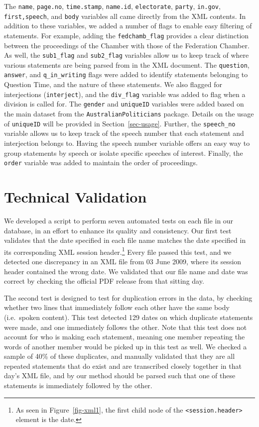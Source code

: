 \documentclass[
  letterpaper,
  DIV=11,
  numbers=noendperiod]{scrartcl}
\begin{document}
The \texttt{name}, \texttt{page.no}, \texttt{time.stamp},
\texttt{name.id}, \texttt{electorate}, \texttt{party}, \texttt{in.gov},
\texttt{first,speech}, and \texttt{body} variables all came directly
from the XML contents. In addition to these variables, we added a number
of flags to enable easy filtering of statements. For example, adding the
\texttt{fedchamb\_flag} provides a clear distinction between the
proceedings of the Chamber with those of the Federation Chamber. As
well, the \texttt{sub1\_flag} and \texttt{sub2\_flag} variables allow us
to keep track of where various statements are being parsed from in the
XML document. The \texttt{question}, \texttt{answer}, and
\texttt{q\_in\_writing} flags were added to identify statements
belonging to Question Time, and the nature of these statements. We also
flagged for interjections (\texttt{interject}), and the
\texttt{div\_flag} variable was added to flag when a division is called
for. The \texttt{gender} and \texttt{uniqueID} variables were added
based on the main dataset from the \texttt{AustralianPoliticians}
package. Details on the usage of \texttt{uniqueID} will be provided in
Section~\ref{sec-usage}. Further, the \texttt{speech\_no} variable
allows us to keep track of the speech number that each statement and
interjection belongs to. Having the speech number variable offers an
easy way to group statements by speech or isolate specific speeches of
interest. Finally, the \texttt{order} variable was added to maintain the
order of proceedings.

\hypertarget{technical-validation}{%
\section{Technical Validation}\label{technical-validation}}

We developed a script to perform seven automated tests on each file in
our database, in an effort to enhance its quality and consistency. Our
first test validates that the date specified in each file name matches
the date specified in its corresponding XML session header.\footnote{As
  seen in Figure~\ref{fig-xml1}, the first child node of the
  \texttt{\textless{}session.header\textgreater{}} element is the date.}
Every file passed this test, and we detected one discrepancy in an XML
file from 03 June 2009, where its session header contained the wrong
date. We validated that our file name and date was correct by checking
the official PDF release from that sitting day.

The second test is designed to test for duplication errors in the data,
by checking whether two lines that immediately follow each other have
the same body (i.e.~spoken content). This test detected 129 dates on
which duplicate statements were made, and one immediately follows the
other. Note that this test does not account for who is making each
statement, meaning one member repeating the words of another member
would be picked up in this test as well. We checked a sample of 40\% of
these duplicates, and manually validated that they are all repeated
statements that do exist and are transcribed closely together in that
day's XML file, and by our method should be parsed such that one of
these statements is immediately followed by the other.
\end{document}
